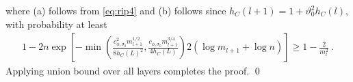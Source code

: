where (a) follows from \eqref{eq:rip4} and (b) follows since $h_C(l+1) = 1 + \vartheta_0^2 h_C(l)$, with probability at least 
\begin{align*}
1 - 2n \exp\left[ - \min \left( \frac{c^2_{\phi,\sigma_0} m_{l+1}^{1/2}}{8 h_C(L)^2}, \frac{c_{\phi,\sigma_0}m_{l+1}^{3/4}}{4 h_C(L)}  \right) 2(\log m_{l+1}+\log n) \right] \geq 1 - \frac{2}{m_l^2}~.
\end{align*}
Applying union bound over all layers completes the proof. \qed 


